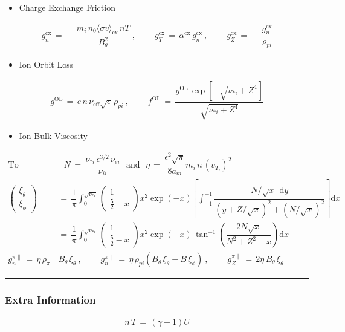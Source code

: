 \documentclass[a4paper,10pt]{article}
\providecommand{\tightlist}{%
  \setlength{\itemsep}{0pt}\setlength{\parskip}{0pt}}
\begin{document}
\begin{itemize}
\tightlist
\item
  Charge Exchange Friction
\end{itemize}

\begin{align}
    g_n^\text{cx} \,=\, -\dfrac{m_i \,n_0 \langle\sigma v\rangle_\text{cx} \,n T}{B_\theta^2}~,~~~~~~~~~~ g_T^\text{cx} \,=\, \alpha^\text{cx}\,g_n^\text{cx}~,~~~~~~~~~~ g_Z^\text{cx} \,=\, -\dfrac{g_n^\text{cx}}{\rho_{pi}}
\end{align}

\begin{itemize}
\tightlist
\item
  Ion Orbit Loss
\end{itemize}

\begin{align}
    g^\text{OL} \,=\, e \,n\, \nu_\text{eff} \sqrt{\epsilon} \,\rho_{pi}~,~~~~~~~~~~ f^\text{OL} \,=\, \dfrac{g^\text{OL}\,\exp\left[-\sqrt{\nu_{*i} + Z^4}\right]}{\sqrt{\nu_{*i} + Z^4}}
\end{align}

\begin{itemize}
\tightlist
\item
  Ion Bulk Viscosity
\end{itemize}

\begin{align}
    \text{To consolidate:}&~~~ N \,=\, \dfrac{\nu_{*i}\,\epsilon^{3/2}\,\nu_{ei}}{\nu_{ii}} ~~~\text{and}~~~ \eta \,=\, \dfrac{\epsilon^2 \sqrt{\pi}}{8 a_m} m_i \,n\, (v_{T_i})^2 \\
    \begin{pmatrix}\xi_\theta \\[1ex] \xi_\phi \end{pmatrix} \,&=\, \dfrac{1}{\pi} \int_0^{\sqrt{\nu_{*i}}} \begin{pmatrix} 1 \\ \frac{5}{2} - x \end{pmatrix} x^2 \exp(-x) \left[\int_{-1}^{+1} \dfrac{N / \sqrt{x} ~~ \text{d}y}{\left(y + Z / \sqrt{x}\right)^2 + \left(N / \sqrt{x}\right)^2}\right] \text{d}x \\
    &=\, \dfrac{1}{\pi} \int_0^{\sqrt{\nu_{*i}}} \begin{pmatrix} 1 \\ \frac{5}{2} - x \end{pmatrix} x^2 \exp(-x) \, \tan^{-1}\left(\dfrac{2 N \sqrt{x}}{N^2 + Z^2 - x}\right) \text{d}x \\
    g_n^{\pi\parallel} \,=\, \eta \, \rho_{\pi}& B_\theta \, \xi_\theta~,~~~~~~~~~~ g_n^{\pi\parallel} \,=\, \eta \, \rho_{pi} \left(B_\theta\,\xi_\theta - B\,\xi_\phi\right)~,~~~~~~~~~~ g_Z^{\pi\parallel} \,=\, 2\eta \, B_\theta \, \xi_\theta 
\end{align}

\begin{center}\rule{0.5\linewidth}{\linethickness}\end{center}

\hypertarget{extra-information}{%
\subsubsection{Extra Information}\label{extra-information}}

\begin{align}
    n\,T \,=\, \left(\gamma - 1\right)U
\end{align}
\end{document}
